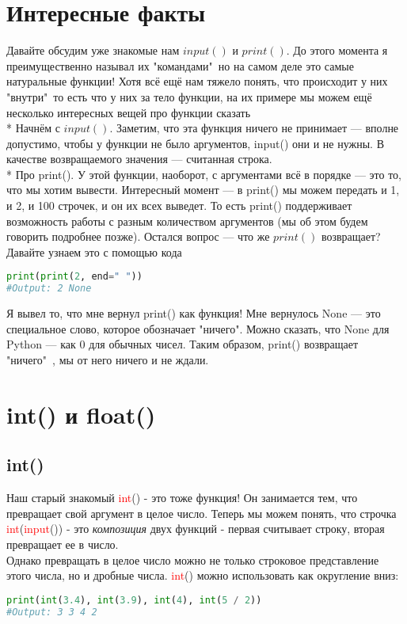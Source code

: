 \documentclass[12pt]{article} %
\begin{document}
\section{Интересные факты}
Давайте обсудим уже знакомые нам $input()$ и $print()$. До этого момента я преимущественно называл их "командами"\, но на самом деле это самые натуральные функции! Хотя всё ещё нам тяжело понять, что происходит у них "внутри"\, то есть что у них за тело функции, на их примере мы можем ещё несколько интересных вещей про функции сказать
\\* Начнём с $input()$. Заметим, что эта функция ничего не принимает --- вполне допустимо, чтобы у функции не было аргументов, input() они и не нужны. В качестве возвращаемого значения --- считанная строка.
\\* Про print(). У этой функции, наоборот, с аргументами всё в порядке --- это то, что мы хотим вывести. Интересный момент --- в print() мы можем передать и 1, и 2, и 100 строчек, и он их всех выведет. То есть print() поддерживает возможность работы с разным количеством аргументов (мы об этом будем говорить подробнее позже). Остался вопрос --- что же $print()$ возвращает? Давайте узнаем это с помощью кода
\begin{lstlisting}[language=Python]
print(print(2, end=" "))
#Output: 2 None
\end{lstlisting}
Я вывел то, что мне вернул print() как функция! Мне вернулось None --- это специальное слово, которое обозначает "ничего". Можно сказать, что None для Python --- как 0 для обычных чисел. Таким образом, print() возвращает "ничего"\ , мы от него ничего и не ждали.

\section{int() и float()}
\subsection{int()}
Наш старый знакомый \textcolor{red}{int}() - это тоже функция! Он занимается тем, что превращает свой аргумент в целое число. Теперь мы можем понять, что строчка \textcolor{red}{int}(\textcolor{red}{input}()) - это \textit{композиция} двух функций - первая считывает строку, вторая превращает ее в число.\\
Однако превращать в целое число можно не только строковое представление этого числа, но и дробные числа. \textcolor{red}{int}() можно использовать как округление вниз:
\begin{lstlisting}[language=Python]
print(int(3.4), int(3.9), int(4), int(5 / 2))
#Output: 3 3 4 2
\end{lstlisting} 
\end{document}

